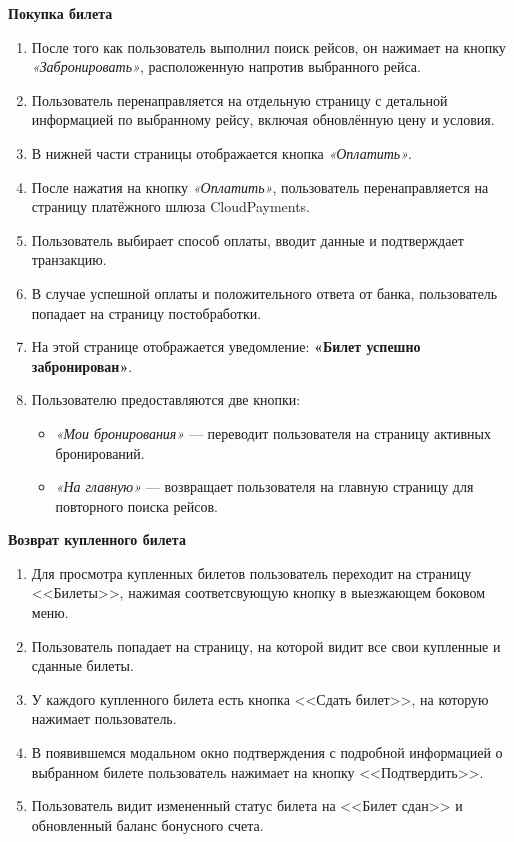 \textbf{Покупка билета}
\begin{enumerate}
    \item После того как пользователь выполнил поиск рейсов, он нажимает на кнопку \textit{«Забронировать»}, расположенную напротив выбранного рейса.
    \item Пользователь перенаправляется на отдельную страницу с детальной информацией по выбранному рейсу, включая обновлённую цену и условия.
    \item В нижней части страницы отображается кнопка \textit{«Оплатить»}.
    \item После нажатия на кнопку \textit{«Оплатить»}, пользователь перенаправляется на страницу платёжного шлюза CloudPayments.
    \item Пользователь выбирает способ оплаты, вводит данные и подтверждает транзакцию.
    \item В случае успешной оплаты и положительного ответа от банка, пользователь попадает на страницу постобработки.
    \item На этой странице отображается уведомление: \textbf{«Билет успешно забронирован»}.
    \item Пользователю предоставляются две кнопки:
    \begin{itemize}
        \item \textit{«Мои бронирования»} — переводит пользователя на страницу активных бронирований.
        \item \textit{«На главную»} — возвращает пользователя на главную страницу для повторного поиска рейсов.
    \end{itemize}
\end{enumerate}

\textbf{Возврат купленного билета}
\begin{enumerate}
	\item Для просмотра купленных билетов пользователь переходит на страницу <<Билеты>>, нажимая соответсвующую кнопку в выезжающем боковом меню.
	\item Пользователь попадает на страницу, на которой видит все свои купленные и сданные билеты.
	\item У каждого купленного билета есть кнопка <<Сдать билет>>, на которую нажимает пользователь.
	\item В появившемся модальном окно подтверждения с подробной информацией о выбранном билете пользователь нажимает на кнопку <<Подтвердить>>.
  \item Пользователь видит измененный статус билета на <<Билет сдан>> и обновленный баланс бонусного счета.
\end{enumerate}

